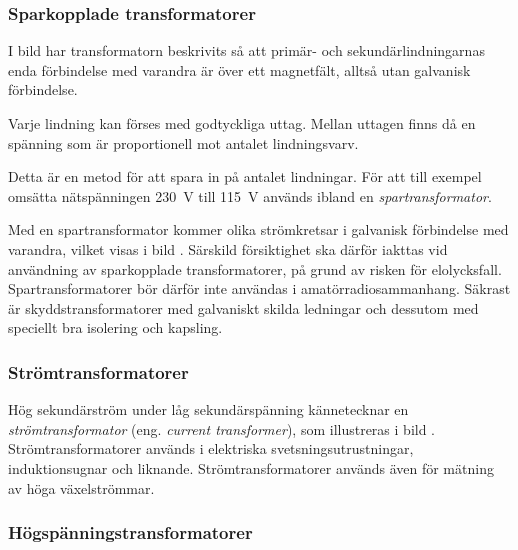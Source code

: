 \subsubsection{Sparkopplade transformatorer}


I bild  har transformatorn beskrivits så att primär- och
sekundärlindningarnas enda förbindelse med varandra är över ett magnetfält,
alltså utan galvanisk förbindelse.

Varje lindning kan förses med godtyckliga uttag. Mellan uttagen finns 
då en spänning som är proportionell mot antalet lindningsvarv.

Detta är en metod för att spara in på antalet lindningar.
För att till exempel omsätta nätspänningen \SI{230}{\volt} till \SI{115}{\volt}
används ibland en \emph{spartransformator}.

Med en spartransformator kommer olika strömkretsar i galvanisk förbindelse med
varandra, vilket visas i bild . Särskild försiktighet ska därför 
iakttas vid användning av sparkopplade transformatorer, på grund av risken för 
elolycksfall. Spartransformatorer bör därför inte användas i amatörradiosammanhang.
Säkrast är skyddstransformatorer med galvaniskt skilda ledningar och dessutom 
med speciellt bra isolering och kapsling.

\subsubsection{Strömtransformatorer}

Hög sekundärström under låg sekundärspänning kännetecknar en
\emph{strömtransformator} (eng. \emph{current transformer}),
som illustreras i bild .
Strömtransformatorer används i elektriska svetsningsutrustningar,
induktionsugnar och liknande. Strömtransformatorer används även för mätning 
av höga växelströmmar.


\subsubsection{Högspänningstransformatorer}

